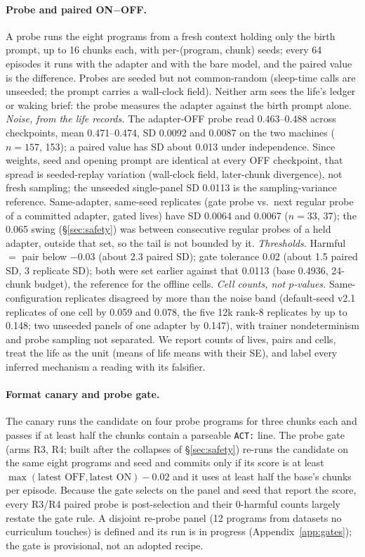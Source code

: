 \documentclass{article}
\newcommand{\onoff}{ON$-$OFF}
\begin{document}
\paragraph{Probe and paired \onoff{}.} A probe runs the eight programs from a fresh context holding only the birth prompt, up to 16 chunks each, with per-(program, chunk) seeds; every 64 episodes it runs with the adapter and with the bare model, and the paired value is the difference. Probes are seeded but not common-random (sleep-time calls are unseeded; the prompt carries a wall-clock field). Neither arm sees the life's ledger or waking brief: the probe measures the adapter against the birth prompt alone. \emph{Noise, from the life records.} The adapter-OFF probe read 0.463--0.488 across checkpoints, mean 0.471--0.474, SD 0.0092 and 0.0087 on the two machines ($n = 157$, 153); a paired value has SD about 0.013 under independence. Since weights, seed and opening prompt are identical at every OFF checkpoint, that spread is seeded-replay variation (wall-clock field, later-chunk divergence), not fresh sampling; the unseeded single-panel SD 0.0113 is the sampling-variance reference. Same-adapter, same-seed replicates (gate probe vs.\ next regular probe of a committed adapter, gated lives) have SD 0.0064 and 0.0067 ($n = 33$, 37); the 0.065 swing (\S\ref{sec:safety}) was between consecutive regular probes of a held adapter, outside that set, so the tail is not bounded by it. \emph{Thresholds.} Harmful $=$ pair below $-0.03$ (about 2.3 paired SD); gate tolerance 0.02 (about 1.5 paired SD, 3 replicate SD); both were set earlier against that 0.0113 (base 0.4936, 24-chunk budget), the reference for the offline cells. \emph{Cell counts, not $p$-values.} Same-configuration replicates disagreed by more than the noise band (default-seed v2.1 replicates of one cell by 0.059 and 0.078, the five 12k rank-8 replicates by up to 0.148; two unseeded panels of one adapter by 0.147), with trainer nondeterminism and probe sampling not separated. We report counts of lives, pairs and cells, treat the life as the unit (means of life means with their SE), and label every inferred mechanism a reading with its falsifier.

\paragraph{Format canary and probe gate.} The canary runs the candidate on four probe programs for three chunks each and passes if at least half the chunks contain a parseable \texttt{ACT:} line. The probe gate (arms R3, R4; built after the collapses of \S\ref{sec:safety}) re-runs the candidate on the same eight programs and seed and commits only if its score is at least $\max(\text{latest OFF}, \text{latest ON}) - 0.02$ and it uses at least half the base's chunks per episode. Because the gate selects on the panel and seed that report the score, every R3/R4 paired probe is post-selection and their 0-harmful counts largely restate the gate rule. A disjoint re-probe panel (12 programs from datasets no curriculum touches) is defined and its run is in progress (Appendix~\ref{app:gates}); the gate is provisional, not an adopted recipe.
\end{document}
